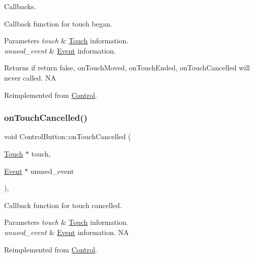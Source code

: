 Callbacks. 

Callback function for touch began.


\begin{DoxyParams}{Parameters}
{\em touch} & \hyperlink{classTouch}{Touch} information. \\
\hline
{\em unused\+\_\+event} & \hyperlink{classEvent}{Event} information. \\
\hline
\end{DoxyParams}
\begin{DoxyReturn}{Returns}
if return false, on\+Touch\+Moved, on\+Touch\+Ended, on\+Touch\+Cancelled will never called.  NA 
\end{DoxyReturn}


Reimplemented from \hyperlink{classControl_a0cf2e20cea5b57b263e965be4a19ab52}{Control}.

\mbox{\label{classControlButton_a95558febae1ea6790245d093766ba20e}} 
\subsubsection{\texorpdfstring{on\+Touch\+Cancelled()}{onTouchCancelled()}\hspace{0.1cm}{\footnotesize\ttfamily [1/2]}}
{\footnotesize\ttfamily void Control\+Button\+::on\+Touch\+Cancelled (\begin{DoxyParamCaption}\item[{\hyperlink{classTouch}{Touch} $\ast$}]{touch,  }\item[{\hyperlink{classEvent}{Event} $\ast$}]{unused\+\_\+event }\end{DoxyParamCaption})\hspace{0.3cm}{\ttfamily [override]}, {\ttfamily [virtual]}}

Callback function for touch cancelled.


\begin{DoxyParams}{Parameters}
{\em touch} & \hyperlink{classTouch}{Touch} information. \\
\hline
{\em unused\+\_\+event} & \hyperlink{classEvent}{Event} information.  NA \\
\hline
\end{DoxyParams}


Reimplemented from \hyperlink{classControl_a573efad6a6b492f4a6f4c5d06f0cdb88}{Control}.

